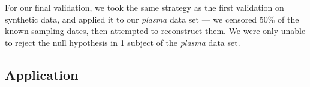 \documentclass[12pt]{article}
\begin{document}

For our final validation, we took the same strategy as the first validation on synthetic data, and applied it to our {\em plasma} data set --- we censored 50\% of the known sampling dates, then attempted to reconstruct them.
We were only unable to reject the null hypothesis in 1 subject of the {\em plasma} data set.


\subsection * {Application} \label{sec:mixed_data}


\end{document}
